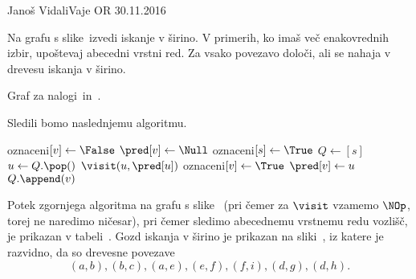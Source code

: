 
\begin{naloga}{Janoš Vidali}{Vaje OR 30.11.2016}
\begin{vprasanje}
Na grafu s slike~\fig izvedi iskanje v širino.
V primerih, ko imaš več ena\-ko\-vred\-nih izbir,
upoštevaj abecedni vrstni red.
Za vsako povezavo določi, ali se nahaja v drevesu iskanja v širino.

\begin{slika}
\pgfslika
\caption{Graf za nalogi~\nal in~\nal[dfs].}
\end{slika}
\end{vprasanje}

\begin{odgovor}
Sledili bomo naslednjemu algoritmu.
\begin{small}
\begin{algorithmic}
		\State oznaceni$[v] \gets \False$
        \State $\pred[v] \gets \Null$
	\EndFor
			\State oznaceni$[s] \gets \True$
			\State $Q \gets [s]$
				\State $u \gets Q.\pop()$
                \State $\visit(u, \pred[u])$
						\State oznaceni$[v] \gets \True$
						\State $\pred[v] \gets u$
						\State $Q.\append(v)$
					\EndIf
				\EndFor
			\EndWhile
		\EndIf
	\EndFor
\EndFunction
\end{algorithmic}
\end{small}
%
Potek zgornjega algoritma na grafu s slike~\fig
(pri čemer za $\visit$ vzamemo $\NOp$, torej ne naredimo ničesar),
pri čemer sledimo abecednemu vrstnemu redu vozlišč,
je prikazan v tabeli~\tab.
Gozd iskanja v širino je prikazan na sliki~,
iz katere je razvidno, da so drevesne povezave
$$
(a, b), (b, c), (a, e), (e, f), (f, i), (d, g), (d, h).
$$


\end{odgovor}
\end{naloga}
